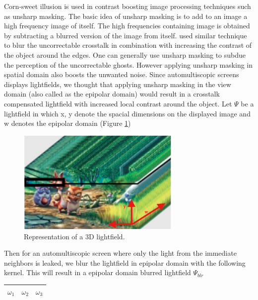 Corn-sweet illusion \cite{ wiki:cornsweet} is used in contrast boosting image processing techniques such as unsharp masking. The basic idea of unsharp masking is to add to an image a high frequency image of itself. The high frequencies containing image is obtained by subtracting a blurred version of the image from itself. \cite{van2011perceptually} used similar technique to blur the uncorrectable crosstalk in combination with increasing the contrast of the object around the edges. One can generally use unsharp masking to subdue the perception of the uncorrectable ghosts. However applying unsharp masking in spatial domain also boosts the unwanted noise. Since automultiscopic screens displays lightfields, we thought that applying unsharp masking in the view domain (also called as the epipolar domain) would result in a crosstalk compensated lightfield with increased local contrast around the object. Let $\Psi$ be a lightfield in which x, y denote the spacial dimensions on the displayed image and w denotes the epipolar domain (Figure \ref{fig:lightfeild})
\begin{figure}[htbp]
\centering
    \includegraphics[width=0.7\textwidth]{./Template_Figures/lightfield}
    \caption{Representation of a 3D lightfield.\label{fig:lightfeild}}
\end{figure}
Then for an automultiscopic screen where only the light from the immediate neighbors is leaked, we blur the lightfield in epipolar domain with the following kernel. This will result in a epipolar domain blurred lightfield $\Psi_{blr}$
\begin{table}[htbp]
\centering
\begin{tabular}{|c|c|c|}
\hline
$\omega_1$ & $\omega_2$ & $\omega_3$ \\
\hline
\end{tabular}
\label{tab:blurring_kernel}
\end{table}

